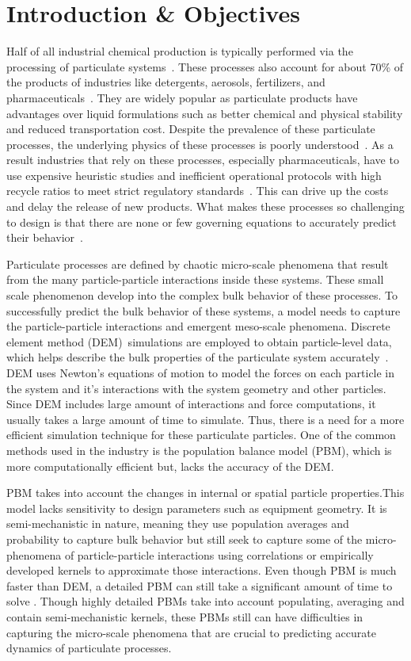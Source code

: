 \documentclass[preprint,11pt,authoryear]{elsarticle}
\begin{document}
\section{Introduction \& Objectives} 
Half of all industrial chemical production is typically performed via the
processing of particulate systems~\citep{seville1997}. These processes 
also account
for about 70\% of the products of industries like detergents, aerosols,
fertilizers, and pharmaceuticals~\citep{Litster2016}. They are
widely popular as particulate products have advantages over liquid
formulations such as better chemical and physical stability and reduced
transportation cost. Despite the prevalence of these particulate processes,
the underlying physics of these processes is poorly
understood~\citep{Rogers2013}. As a result industries that rely on these
processes, especially pharmaceuticals, have to use expensive heuristic studies
and inefficient operational protocols with high recycle ratios to meet strict
regulatory standards~\citep{Ramachandran2009}. This can drive up the costs and
delay the release of new products. What makes these processes so challenging
to design is that there are none or few governing equations to accurately
predict their behavior~\citep{sen2013}.

Particulate processes are defined by chaotic micro-scale phenomena that result
from the many particle-particle interactions inside these systems. These small
scale phenomenon develop into the complex bulk behavior of these processes. To
successfully predict the bulk behavior of these systems, a model needs to
capture the particle-particle interactions and emergent meso-scale phenomena. 
Discrete element method (DEM)~\citep{Cundall1979}simulations are employed 
to obtain particle-level data, which helps describe the bulk properties 
of the particulate system accurately~\citep{Hancock2011}. DEM uses Newton's 
equations of motion to model the forces on each particle in the system and 
it's interactions with the system geometry and other particles. Since DEM
includes large amount of interactions and force computations, it usually takes
a large amount of time to simulate. Thus, there is a need for a more efficient
simulation technique for these particulate particles. One of the common
methods used in the industry is the population balance model (PBM), which is
more computationally efficient but, lacks the accuracy of the DEM.

PBM takes into account the changes in internal or spatial particle
properties.This model lacks sensitivity to design parameters such as equipment
geometry. It is semi-mechanistic in nature, meaning they use population
averages and probability to capture bulk behavior but still seek to capture
some of the micro-phenomena of particle-particle interactions using
correlations or empirically developed kernels to approximate those
interactions. Even though PBM is much faster than DEM, a detailed PBM can
still take a significant amount of time to solve \citep{Barrasso2013}. 
Though highly detailed PBMs take into account
populating, averaging and contain semi-mechanistic kernels, these PBMs still
can have difficulties in capturing the micro-scale phenomena that are crucial
to predicting accurate dynamics of particulate processes.
\end{document}
